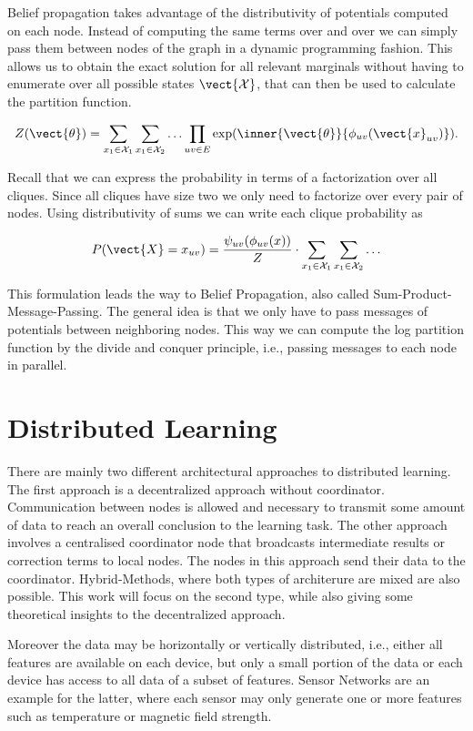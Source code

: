 Belief propagation takes advantage of the distributivity of potentials computed on each node. Instead of computing the same terms over and over we can simply pass them between nodes of the graph in a dynamic programming fashion.
This allows us to obtain the exact solution for all relevant marginals without having to enumerate over all possible states $\vect{\mathcal{X}}$, that can then be used to calculate the partition function.


\begin{equation}
    Z(\vect{\theta}) = \sum_{x_1 \in \mathcal{X}_1} \sum_{x_1 \in \mathcal{X}_2} \ldots \prod_{uv \in E} \exp(\inner{\vect{\theta}}{\phi_{uv}(\vect{x}_{uv})}).
\end{equation}

Recall that we can express the probability in terms of a factorization over all cliques. 
Since all cliques have size two we only need to factorize over every pair of nodes.
Using distributivity of sums we can write each clique probability as

\begin{equation}
    P(\vect{X} = x_{uv}) = \frac{\psi_{uv}(\phi_{uv}(x))}{Z} \cdot \sum_{x_1 \in \mathcal{X}_1} \sum_{x_1 \in \mathcal{X}_2} \ldots 
\end{equation}

This formulation leads the way to Belief Propagation, also called Sum-Product-Message-Passing.
The general idea is that we only have to pass messages of potentials between neighboring nodes.
This way we can compute the log partition function by the divide and conquer principle, i.e., passing messages to each node in parallel.
\section{Distributed Learning}
There are mainly two different architectural approaches to distributed learning. 
The first approach is a decentralized approach without coordinator.
Communication between nodes is allowed and necessary to transmit some amount of data to reach an overall conclusion to the learning task.
The other approach involves a centralised coordinator node that broadcasts intermediate results or correction terms to local nodes.
The nodes in this approach send their data to the coordinator. 
Hybrid-Methods, where both types of architerure are mixed are also possible.
This work will focus on the second type, while also giving some theoretical insights to the decentralized approach.

Moreover the data may be horizontally or vertically distributed, i.e., either all features are available on each device, but only a small portion of the data or each device has access to all data of a subset of features.
Sensor Networks are an example for the latter, where each sensor may only generate one or more features such as temperature or magnetic field strength.

